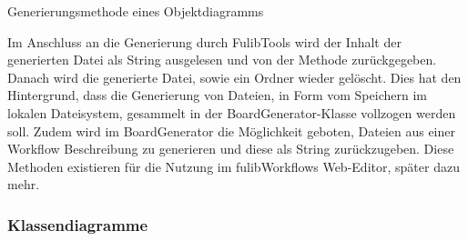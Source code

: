 \begin{listing}[!ht]
    \inputminted[xleftmargin=20pt,linenos,firstnumber=95]{java}{listings/3.1.4/ObjectGeneration.java}
    \caption{Generierungsmethode eines Objektdiagramms}
    \label{listing:object-gen}
\end{listing}

Im Anschluss an die Generierung durch FulibTools wird der Inhalt der generierten Datei als String ausgelesen und von der Methode zurückgegeben.
Danach wird die generierte Datei, sowie ein Ordner wieder gelöscht.
Dies hat den Hintergrund, dass die Generierung von Dateien, in Form vom Speichern im lokalen Dateisystem, gesammelt in der BoardGenerator-Klasse vollzogen werden soll.
Zudem wird im BoardGenerator die Möglichkeit geboten, Dateien aus einer Workflow Beschreibung zu generieren und diese als String zurückzugeben.
Diese Methoden existieren für die Nutzung im fulibWorkflows Web-Editor, später dazu mehr.

\subsubsection{Klassendiagramme}
